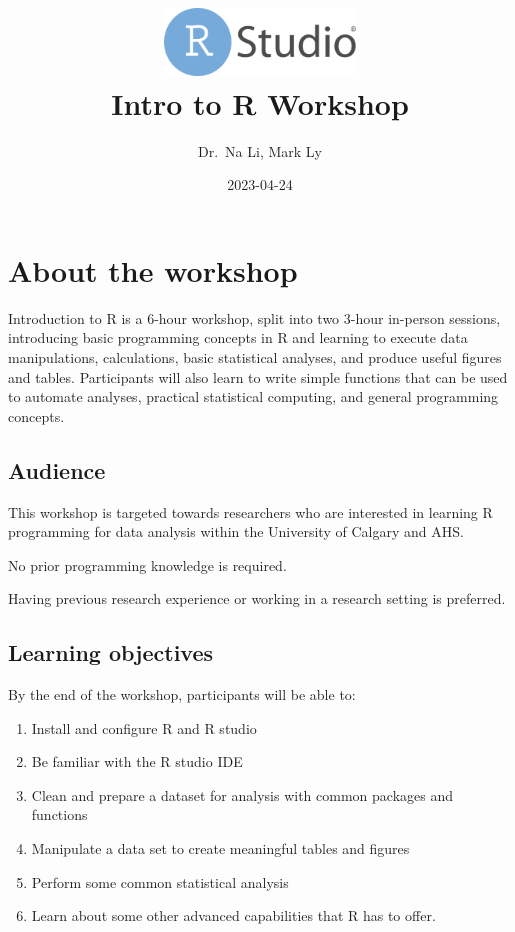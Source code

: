 \documentclass[
]{book}
\title{\includegraphics[width=2in,height=\textheight]{RStudio-Logo-Flat.png}\\
Intro to R Workshop}
\author{Dr.~Na Li, Mark Ly}
\date{2023-04-24}
\begin{document}
\maketitle

{
\setcounter{tocdepth}{1}
\tableofcontents
}
\hypertarget{about-the-workshop}{%
\chapter{About the workshop}\label{about-the-workshop}}

Introduction to R is a 6-hour workshop, split into two 3-hour in-person sessions, introducing basic programming concepts in R and learning to execute data manipulations, calculations, basic statistical analyses, and produce useful figures and tables. Participants will also learn to write simple functions that can be used to automate analyses, practical statistical computing, and general programming concepts.

\hypertarget{audience}{%
\section{Audience}\label{audience}}

This workshop is targeted towards researchers who are interested in learning R programming for data analysis within the University of Calgary and AHS.

No prior programming knowledge is required.

Having previous research experience or working in a research setting is preferred.

\hypertarget{learning-objectives}{%
\section{Learning objectives}\label{learning-objectives}}

By the end of the workshop, participants will be able to:

\begin{enumerate}
\def\labelenumi{\arabic{enumi}.}
\item
  Install and configure R and R studio
\item
  Be familiar with the R studio IDE
\item
  Clean and prepare a dataset for analysis with common packages and functions
\item
  Manipulate a data set to create meaningful tables and figures
\item
  Perform some common statistical analysis
\item
  Learn about some other advanced capabilities that R has to offer.
\end{enumerate}
\end{document}
